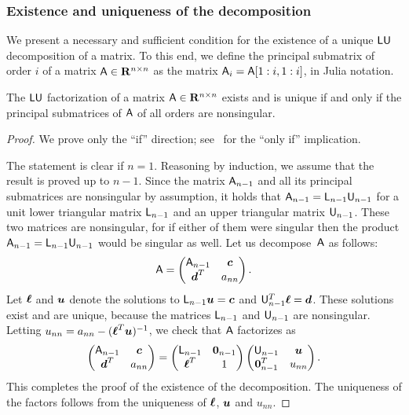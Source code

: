 \subsubsection*{Existence and uniqueness of the decomposition}%
We present a necessary and sufficient condition for the existence of a unique $\mathsf L \mathsf U$ decomposition of a matrix.
To this end, we define the principal submatrix of order $i$ of a matrix $\mathsf A \in \mathbf R^{n \times n}$
as the matrix $\mathsf A_i = \mathsf A[1:i, 1:i]$, in Julia notation.

\begin{proposition}
    \label{proposition:linear_existence_lu}
    The $\mathsf L \mathsf U$ factorization of a matrix $\mathsf A \in \mathbf R^{n \times n}$ exists and is unique if and only if
    the principal submatrices of $\mathsf A$ of all orders are nonsingular.
\end{proposition}
\begin{proof}
    We prove only the ``if'' direction; see~\cite[Theorem 3.4]{MR2265914} for the ``only if'' implication.

    The statement is clear if $n = 1$.
    Reasoning by induction,
    we assume that the result is proved up to $n - 1$.
    Since the matrix $\mathsf A_{n-1}$ and all its principal submatrices are nonsingular by assumption,
    it holds that $\mathsf A_{n-1} = \mathsf L_{n-1} \mathsf U_{n-1}$
    for a unit lower triangular matrix $\mathsf L_{n-1}$ and an upper triangular matrix $\mathsf U_{n-1}$.
    These two matrices are nonsingular,
    for if either of them were singular then the product $\mathsf A_{n-1} = \mathsf L_{n-1} \mathsf U_{n-1}$ would be singular as well.
    Let us decompose~$\mathsf A$ as follows:
    \[
        \mathsf A =
        \begin{pmatrix}
            \mathsf A_{n-1} & \mathbf{\boldsymbol{c}} \\
            \mathbf{\boldsymbol{d}}^T & a_{nn}
        \end{pmatrix}.
    \]
    Let $\mathbf{\boldsymbol{\ell}}$ and $\mathbf{\boldsymbol{u}}$ denote the solutions to $\mathsf L_{n-1} \mathbf{\boldsymbol{u}} = \mathbf{\boldsymbol{c}}$ and $\mathsf U_{n-1}^T \mathbf{\boldsymbol{\ell}} = \mathbf{\boldsymbol{d}}$.
    These solutions exist and are unique,
    because the matrices $\mathsf L_{n-1}$ and $\mathsf U_{n-1}$ are nonsingular.
    Letting $u_{nn} = a_{nn} - (\mathbf{\boldsymbol{\ell}}^T \mathbf{\boldsymbol{u}})^{-1}$,
    we check that $\mathsf A$ factorizes as
    \[
        \begin{pmatrix}
            \mathsf A_{n-1} & \mathbf{\boldsymbol{c}} \\
            \mathbf{\boldsymbol{d}}^T & a_{nn}
        \end{pmatrix}
        =
        \begin{pmatrix}
            \mathsf L_{n-1} & \mathbf{\boldsymbol{0}}_{n-1} \\
            \mathbf{\boldsymbol{\ell}}^T & 1
        \end{pmatrix}
        \begin{pmatrix}
            \mathsf U_{n-1} & \mathbf{\boldsymbol{u}} \\
            \mathbf{\boldsymbol{0}}_{n-1}^T & u_{nn}
        \end{pmatrix}.
    \]
    This completes the proof of the existence of the decomposition.
    The uniqueness of the factors follows from the uniqueness of $\mathbf{\boldsymbol{\ell}}$, $\mathbf{\boldsymbol{u}}$ and $u_{nn}$.
\end{proof}

